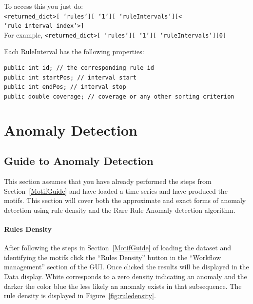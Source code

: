 \documentclass[letterpaper, 12pt]{article}
\def\bsq#1{%
	\lq{#1}\rq}
\begin{document}
To access this you just do:\\
\texttt{<returned\_dict>[\bsq{rules}][\bsq{1}][\bsq{ruleIntervals}][<\bsq{rule\_interval\_index}>]}\\
For example,
\texttt{<returned\_dict>[\bsq{rules}][\bsq{1}][\bsq{ruleIntervals}][0]}

Each RuleInterval has the following properties:
\begin{lstlisting}
public int id; // the corresponding rule id
public int startPos; // interval start
public int endPos; // interval stop
public double coverage; // coverage or any other sorting criterion
\end{lstlisting}


\section{Anomaly Detection}
\label{AnomalyGuide}
\subsection{Guide to Anomaly Detection}

This section assumes that you have already performed the steps from Section~\ref{MotifGuide} and have loaded a time series and have produced the motifs.  This section will cover both the approximate and exact forms of anomaly detection using rule density and the Rare Rule Anomaly detection algorithm.


\paragraph{Rules Density} 

After following the steps in Section~\ref{MotifGuide} of loading the dataset and identifying the motifs click the ``Rules Density'' button in the ``Workflow management'' section of the GUI.  Once clicked the results will be displayed in the Data display.  White corresponds to a zero density indicating an anomaly and the darker the color blue the less likely an anomaly exists in that subsequence.  The rule density is displayed in Figure~\ref{fig:ruledensity}.
\end{document}

